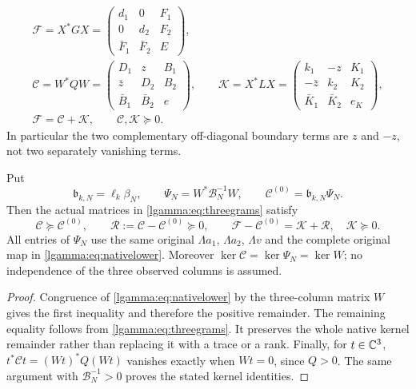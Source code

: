\begin{equation}\label{lgamma:eq:threegrams}
 \begin{gathered}
 \mathcal F=X^*GX=
 \begin{pmatrix}d_1&0&F_1\\0&d_2&F_2\\\bar F_1&\bar F_2&E\end{pmatrix},\\
 \mathcal C=W^*QW=
 \begin{pmatrix}D_1&z&B_1\\\bar z&D_2&B_2\\\bar B_1&\bar B_2&e\end{pmatrix},\qquad
 \mathcal K=X^*LX=
 \begin{pmatrix}k_1&-z&K_1\\-\bar z&k_2&K_2\\\bar K_1&\bar K_2&e_K\end{pmatrix},\\
 \mathcal F=\mathcal C+\mathcal K,\qquad \mathcal C,\mathcal K\succeq0.
 \end{gathered}
\end{equation}
In particular the two complementary off-diagonal boundary terms are
$z$ and $-z$, not two separately vanishing terms.

\begin{lgammatheorem}\label{lgamma:thm:joint}
Put
\begin{equation}\label{lgamma:eq:baseline}
 \mathfrak b_{k,N}=\ell_k\beta_N,\qquad
 \Psi_N=W^*\mathcal B_N^{-1}W,\qquad
 \mathcal C^{(0)}=\mathfrak b_{k,N}\Psi_N.
\end{equation}
Then the actual matrices in \eqref{lgamma:eq:threegrams} satisfy
\begin{equation}\label{lgamma:eq:joint}
 \boxed{\mathcal C\succeq\mathcal C^{(0)},\qquad
 \mathcal R:=\mathcal C-\mathcal C^{(0)}\succeq0,\qquad
 \mathcal F-\mathcal C^{(0)}=\mathcal K+\mathcal R,\quad
 \mathcal K\succeq0.}
\end{equation}
All entries of $\Psi_N$ use the same original $\Lambda a_1$,
$\Lambda a_2$, $\Lambda v$ and the complete original map in
\eqref{lgamma:eq:nativelower}.
Moreover $\ker\mathcal C=\ker\Psi_N=\ker W$; no independence of
the three observed columns is assumed.
\end{lgammatheorem}
\begin{proof}
Congruence of \eqref{lgamma:eq:nativelower} by the three-column matrix $W$
gives the first inequality and therefore the positive remainder.
The remaining equality follows from \eqref{lgamma:eq:threegrams}.  It
preserves the whole native kernel remainder rather than replacing it
with a trace or a rank.
Finally, for $t\in\mathbb C^3$, $t^*\mathcal Ct=(Wt)^*Q(Wt)$ vanishes
exactly when $Wt=0$, since $Q>0$.  The same argument with
$\mathcal B_N^{-1}>0$ proves the stated kernel identities.
\end{proof}

